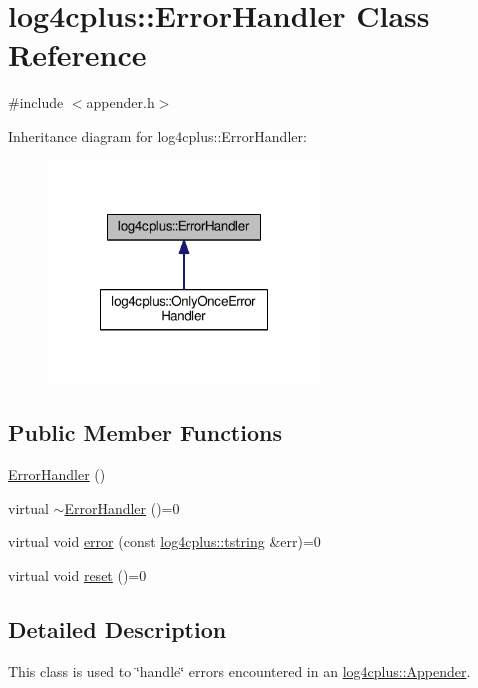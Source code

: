 \hypertarget{classlog4cplus_1_1ErrorHandler}{\section{log4cplus\-:\-:Error\-Handler Class Reference}
\label{classlog4cplus_1_1ErrorHandler}
}


{\ttfamily \#include $<$appender.\-h$>$}



Inheritance diagram for log4cplus\-:\-:Error\-Handler\-:
\nopagebreak
\begin{figure}[H]
\begin{center}
\leavevmode
\includegraphics[width=204pt]{classlog4cplus_1_1ErrorHandler__inherit__graph}
\end{center}
\end{figure}
\subsection*{Public Member Functions}
\begin{DoxyCompactItemize}
\item 
\hyperlink{classlog4cplus_1_1ErrorHandler_a4d492b4e3f22e5d69ae51117c3c7c8db}{Error\-Handler} ()
\item 
virtual \hyperlink{classlog4cplus_1_1ErrorHandler_af823b2a344ccd0704c6e59b3e2ac93df}{$\sim$\-Error\-Handler} ()=0
\item 
virtual void \hyperlink{classlog4cplus_1_1ErrorHandler_aae49bc61a7ed8c20eb7315da388fa86b}{error} (const \hyperlink{namespacelog4cplus_a3c9287f6ebcddc50355e29d71152117b}{log4cplus\-::tstring} \&err)=0
\item 
virtual void \hyperlink{classlog4cplus_1_1ErrorHandler_af19320cf34e82877d7906209ab20242d}{reset} ()=0
\end{DoxyCompactItemize}


\subsection{Detailed Description}
This class is used to \char`\"{}handle\char`\"{} errors encountered in an \hyperlink{classlog4cplus_1_1Appender}{log4cplus\-::\-Appender}. 

